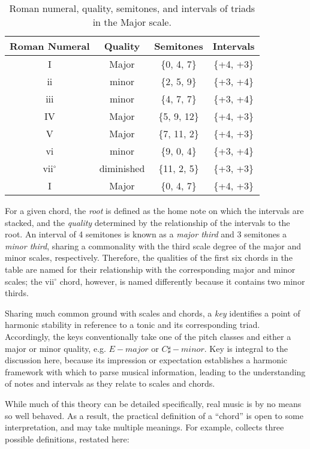 \begin{table}[h!]
\begin{center}
\caption{Roman numeral, quality, semitones, and intervals of triads in the Major scale.}
\label{tab:major_triads}
\begin{tabular}{c | c | c | c }
Roman Numeral & Quality & Semitones & Intervals \\
\hline
I & Major & \{0, 4, 7\} & \{+4, +3\}\\
ii & minor & \{2, 5, 9\} & \{+3, +4\}\\
iii & minor & \{4, 7, 7\} & \{+3, +4\}\\
IV & Major & \{5, 9, 12\} & \{+4, +3\}\\
V & Major & \{7, 11, 2\} & \{+4, +3\}\\
vi & minor & \{9, 0, 4\} & \{+3, +4\}\\
vii$^\circ$ & diminished & \{11, 2, 5\} & \{+3, +3\}\\
I & Major & \{0, 4, 7\} & \{+4, +3\}\\
\hline
\end{tabular}
\end{center}
\end{table}

For a given chord, the \emph{root} is defined as the home note on which the intervals are stacked, and the \emph{quality} determined by the relationship of the intervals to the root.
An interval of 4 semitones is known as a \emph{major third} and 3 semitones a \emph{minor third}, sharing a commonality with the third scale degree of the major and minor scales, respectively.
Therefore, the qualities of the first six chords in the table are named for their relationship with the corresponding major and minor scales; the vii$^\circ$ chord, however, is named differently because it contains two minor thirds.

Sharing much common ground with scales and chords, a \emph{key} identifies a point of harmonic stability in reference to a tonic and its corresponding triad.
Accordingly, the keys conventionally take one of the pitch classes and either a major or minor quality, e.g. $E-major$ or $C\sharp-minor$.
Key is integral to the discussion here, because its impression or expectation establishes a harmonic framework with which to parse musical information, leading to the understanding of notes and intervals as they relate to scales and chords.


While much of this theory can be detailed specifically, real music is by no means so well behaved.
As a result, the practical definition of a ``chord'' is open to some interpretation, and may take multiple meanings.
For example, \cite{McVicar2013} collects three possible definitions, restated here:

